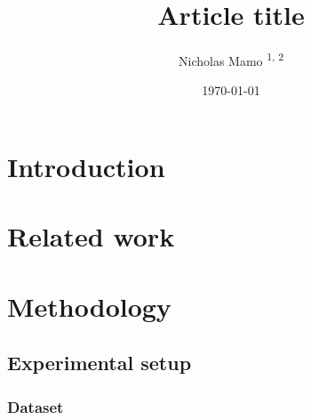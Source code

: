 \documentclass[twocolumn]{elegantarticle}
\title{Article title}
\author{Nicholas Mamo \textsuperscript{1, 2}}
\affiliation{\textsuperscript{1} University of Malta, Msida, Malta \\ \textsuperscript{2} Independent}
\date{\today}
\begin{document}
	\maketitle
	
	\section{Introduction}
	
		\lipsum[1-3]
	
	\section{Related work}
	
		\lipsum[4-8]
		
	\section{Methodology}
	
		\lipsum[9]
		
		\subsection{Experimental setup}
		
			\lipsum[10]
			
			\subsubsection{Dataset}
			
				\lipsum[11]
\end{document}

